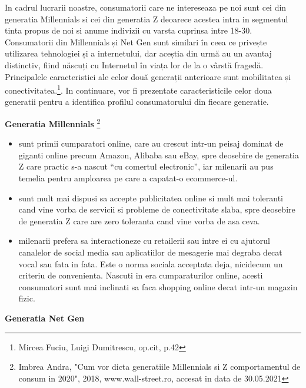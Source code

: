 \documentclass[a4paper, 12pt]{article}
\begin{document}
		\quad In cadrul lucrarii noastre, consumatorii care ne intereseaza pe noi sunt cei din generatia Millennials si cei din generatia Z deoarece acestea intra in segmentul tinta propus de noi si anume indivizii cu varsta cuprinsa intre 18-30. Consumatorii din Millennials și Net Gen sunt similari în ceea ce privește utilizarea tehnologiei și a internetului, dar aceștia din urmă au un avantaj distinctiv, fiind născuți cu Internetul în viața lor de la o vârstă fragedă. Principalele caracteristici ale celor două generații anterioare sunt mobilitatea și conectivitatea.\footnote{Mircea Fuciu, Luigi Dumitrescu, op.cit, p.42}. In continuare, vor fi prezentate caracteristicile celor doua generatii pentru a identifica profilul consumatorului din fiecare generatie.
	\bigskip
	
		\quad\textbf{ Generatia Millennials }\footnote{Imbrea Andra, "Cum vor dicta generatiile Millennials si Z comportamentul de consum in 2020", 2018, www.wall-street.ro, accesat in data de 30.05.2021}
		\begin{itemize}
			\item sunt primii cumparatori online, care au crescut intr-un peisaj dominat de giganti online precum Amazon, Alibaba sau eBay, spre deosebire de generatia Z care practic s-a nascut “cu comertul electronic”, iar milenarii au pus temelia pentru amploarea pe care a capatat-o ecommerce-ul.
			\item sunt mult mai dispusi sa accepte publicitatea online si mult mai toleranti cand vine vorba de servicii si probleme de conectivitate slaba, spre deosebire de generatia Z care are zero toleranta cand vine vorba de asa ceva.
			\item milenarii prefera sa interactioneze cu retailerii sau intre ei cu ajutorul canalelor de social media sau aplicatiilor de mesagerie mai degraba decat vocal sau fata in fata. Este o norma sociala acceptata deja, nicidecum un criteriu de convenienta. Nascuti in era cumparaturilor online, acesti consumatori sunt mai inclinati sa faca shopping online decat intr-un magazin fizic. 
		\end{itemize}
		\quad \textbf{Generatia Net Gen}
\end{document}
